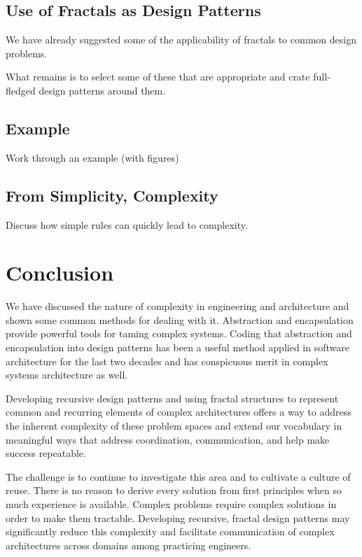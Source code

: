 \documentclass[jou,apacite]{apa6}
\begin{document}
\subsection{Use of Fractals as Design Patterns}
We have already suggested some of the applicability of fractals to common design problems.  

What remains is to select some of these that are appropriate and crate full-fledged design patterns around them.

\subsection{Example} %
Work through an example (with figures)

\subsection{From Simplicity, Complexity}
Discuss how simple rules can quickly lead to complexity.

\section{Conclusion}  %
We have discussed the nature of complexity in engineering and architecture and shown some common methods for dealing with it.  Abstraction and encapsulation provide powerful tools for taming complex systems.  Coding that abstraction and encapsulation into design patterns has been a useful method applied in software architecture for the last two decades and has conspicuous merit in complex systems architecture as well.

Developing recursive design patterns and using fractal structures to represent common and recurring elements of complex architectures offers a way to address the inherent complexity of these problem spaces and extend our vocabulary in meaningful ways that address coordination, communication, and help make success repeatable.

The challenge is to continue to investigate this area and to cultivate a culture of reuse.  There is no reason to derive every solution from first principles when so much experience is available.  Complex problems require complex solutions in order to make them tractable.  Developing recursive, fractal design patterns may significantly reduce this complexity and facilitate communication of complex architectures across domains among practicing engineers.


\end{document}

